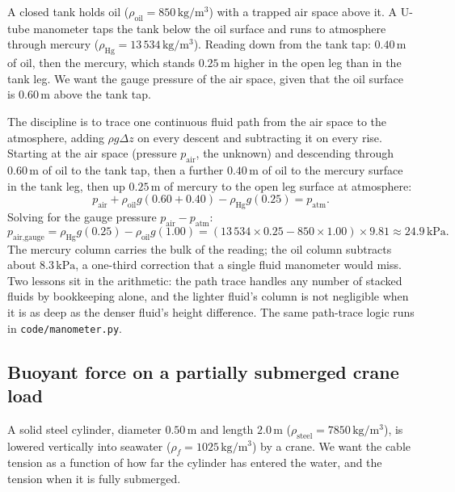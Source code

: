 A closed tank holds oil ($\rho_{\text{oil}} = 850\,\si{\kilogram\per
\meter\cubed}$) with a trapped air space above it. A U-tube manometer
taps the tank below the oil surface and runs to atmosphere through
mercury ($\rho_{\text{Hg}} = 13\,534\,\si{\kilogram\per\meter\cubed}$).
Reading down from the tank tap: $0.40\,\si{\meter}$ of oil, then the
mercury, which stands $0.25\,\si{\meter}$ higher in the open leg than in
the tank leg. We want the gauge pressure of the air space, given that the
oil surface is $0.60\,\si{\meter}$ above the tank tap.

The discipline is to trace one continuous fluid path from the air space
to the atmosphere, adding $\rho g \Delta z$ on every descent and
subtracting it on every rise. Starting at the air space (pressure
$p_{\text{air}}$, the unknown) and descending through $0.60\,\si{\meter}$
of oil to the tank tap, then a further $0.40\,\si{\meter}$ of oil to the
mercury surface in the tank leg, then up $0.25\,\si{\meter}$ of mercury
to the open leg surface at atmosphere:
\[
p_{\text{air}}
+ \rho_{\text{oil}} g (0.60 + 0.40)
- \rho_{\text{Hg}} g (0.25)
= p_{\text{atm}}.
\]
Solving for the gauge pressure $p_{\text{air}} - p_{\text{atm}}$:
\[
p_{\text{air,gauge}}
= \rho_{\text{Hg}} g (0.25) - \rho_{\text{oil}} g (1.00)
= (13\,534 \times 0.25 - 850 \times 1.00) \times 9.81
\approx 24.9\,\text{kPa}.
\]
The mercury column carries the bulk of the reading; the oil column
subtracts about $8.3\,\text{kPa}$, a one-third correction that a single
fluid manometer would miss. Two lessons sit in the arithmetic: the path
trace handles any number of stacked fluids by bookkeeping alone, and the
lighter fluid's column is not negligible when it is as deep as the
denser fluid's height difference. The same path-trace logic runs in
\texttt{code/manometer.py}.

\subsection{Buoyant force on a partially submerged crane load}

A solid steel cylinder, diameter $0.50\,\si{\meter}$ and length $2.0\,
\si{\meter}$ ($\rho_{\text{steel}} = 7850\,\si{\kilogram\per\meter
\cubed}$), is lowered vertically into seawater ($\rho_f = 1025\,\si{
\kilogram\per\meter\cubed}$) by a crane. We want the cable tension as a
function of how far the cylinder has entered the water, and the tension
when it is fully submerged.


